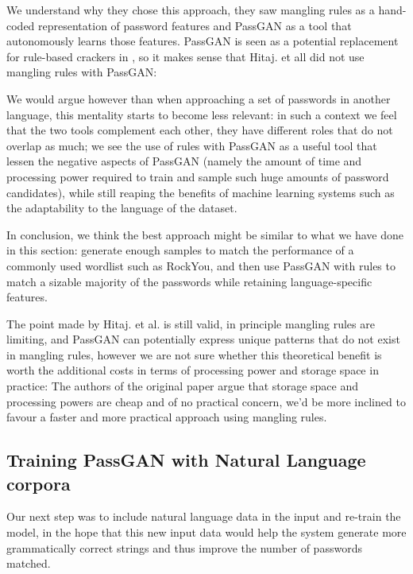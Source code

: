 We understand why they chose this approach, they saw mangling rules as a hand-coded representation of password features and PassGAN as a tool that autonomously learns those features.
PassGAN is seen as a potential replacement for rule-based crackers in \cite{PassGAN}, so it makes sense that Hitaj. et all did not use mangling rules with PassGAN:

We would argue however than when approaching a set of passwords in another language, this mentality starts to become less relevant: in such a context we feel that the two tools complement each other, they have different roles that do not overlap as much; we see the use of rules with PassGAN as a useful tool that lessen the negative aspects of PassGAN (namely the amount of time and processing power required to train and sample such huge amounts of password candidates), while still reaping the benefits of machine learning systems such as the adaptability to the language of the dataset.

In conclusion, we think the best approach might be similar to what we have done in this section: generate enough samples to match the performance of a commonly used wordlist such as RockYou, and then use PassGAN with rules to match a sizable majority of the passwords while retaining language-specific features.

The point made by Hitaj. et al. is still valid, in principle mangling rules are limiting, and PassGAN can potentially express unique patterns that do not exist in mangling rules, however we are not sure whether this theoretical benefit is worth the additional costs in terms of processing power and storage space in practice: The authors of the original paper argue that storage space and processing powers are cheap and of no practical concern, we'd be more inclined to favour a faster and more practical approach using mangling rules.%

\subsection{Training PassGAN with Natural Language corpora} \label{subsec:nl-testing}
Our next step was to include natural language data in the input and re-train the model, in the hope that this new input data would help the system generate more grammatically correct strings and thus improve the number of passwords matched.

